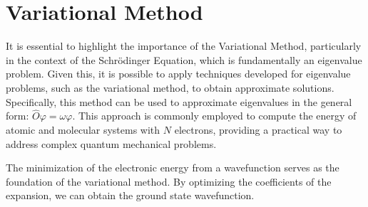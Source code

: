 \newpage
\section{Variational Method}\label{variational_method}

It is essential to highlight the importance of the
Variational Method, particularly in the context of the Schrödinger Equation,
which is fundamentally an eigenvalue problem. Given this, it is possible to
apply techniques developed for eigenvalue problems, such as the variational
method, to obtain approximate solutions. Specifically, this method can be used
to approximate eigenvalues in the general form: $\widehat{O}\varphi =
\omega\varphi$. This approach is commonly employed to compute the energy of
atomic and molecular systems with $N$ electrons, providing a practical way to
address complex quantum mechanical problems.

The minimization of the electronic energy from a wavefunction serves as the
foundation of the variational method. By optimizing the coefficients of the
expansion, we can obtain the ground state wavefunction.

\newpage

